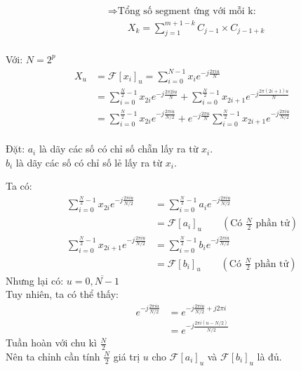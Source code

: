 \documentclass[12pt]{report}
\begin{document}
\begin{align*}
    &\Rightarrow \textrm{Tổng số segment ứng với mỗi k: } \\
    &\quad\quad X_k = \sum_{j = 1}^{m + 1 - k} C_{j - 1} \times C_{j - 1 + k} 
\end{align*}\\[1cm]

\noindent Với:  $N = 2^p$
\begin{align*}
    X_u &= \mathcal{F}[x_i]_u = \sum_{i = 0}^{N - 1} x_i 
    e^{-j\frac{2\pi i u}{N}} \\
    &= \sum_{i = 0}^{\frac{N}{2} - 1} x_{2i} e^{-j\frac{2\pi 2 i u}{N}}
    + \sum_{i = 0}^{\frac{N}{2} - 1} x_{2i + 1} 
    e^{-j\frac{2\pi (2i + 1) u}{N}} \\
    &= \sum_{i = 0}^{\frac{N}{2} - 1} x_{2i} e^{-j\frac{2\pi i u}{N/2}}
    + e^{-j\frac{2\pi u}{N}} 
    \sum_{i = 0}^{\frac{N}{2} - 1} x_{2i+ 1} 
    e^{-j\frac{2\pi i u}{N / 2}}
\end{align*}\\[1cm]

\noindent Đặt: $a_i$ là dãy các số có chỉ số chẵn lấy ra từ $x_i$. \\
\hspace*{22pt} $b_i$ là dãy các số có chỉ số lẻ lấy ra từ $x_i$.

\noindent Ta có: 
\begin{align*}
    \sum_{i = 0}^{\frac{N}{2} - 1} x_{2i} e^{-j\frac{2\pi i u}{N/2}}
    &= \sum_{i = 0}^{\frac{N}{2} - 1} a_i e^{-j\frac{2\pi i u}{N/2}} \\
    &= \mathcal{F}[a_i]_u 
    \quad\quad\left(\textrm{Có }\frac{N}{2}\textrm{ phần tử}\right) \\
    \sum_{i = 0}^{\frac{N}{2} - 1} x_{2i + 1} e^{-j\frac{2\pi i u}{N/2}}
    &= \sum_{i = 0}^{\frac{N}{2} - 1} b_i e^{-j\frac{2\pi i u}{N/2}} \\
    &= \mathcal{F}[b_i]_u
    \quad\quad\left(\textrm{Có }\frac{N}{2}\textrm{ phần tử}\right)
\end{align*}
Nhưng lại có: $u = \overline{0, N - 1}$ \\[1cm]

\newpage
\noindent Tuy nhiên, ta có thể thấy:
\begin{align*}
    e^{-j\frac{2\pi i u}{N/2}} 
    &= e^{-j\frac{2\pi i u}{N/2} + j 2\pi i}  \\
    &= e^{-j\frac{2\pi i (u - N/2)}{N/2}}
\end{align*}
Tuần hoàn với chu kì $\frac{N}{2}$ \\
Nên ta chỉnh cần tính $\frac{N}{2}$ giá trị $u$ cho 
$\mathcal{F}[a_i]_u$ và $\mathcal{F}[b_i]_u$ là đủ. \\[1cm]
\end{document}
